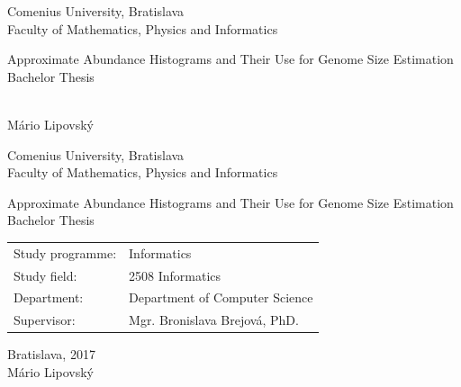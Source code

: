 \documentclass[12pt, oneside]{book}
\def\mfrok{2017}
\def\mfnazov{Approximate Abundance Histograms and Their Use for Genome Size Estimation}
\def\mftyp{Bachelor Thesis}
\def\mfautor{Mário Lipovský}
\def\mfskolitel{Mgr. Bronislava Brejová, PhD.}
\def\mfkonzultant{tit. Meno Priezvisko, tit. }
\def\mfmiesto{Bratislava, \mfrok}
\def\mfodbor{2508 Informatics}
\def\program{Informatics}
\def\mfpracovisko{Department of Computer Science}
\begin{document}

\frontmatter


\thispagestyle{empty}

\begin{center}
\sc\large
Comenius University, Bratislava\\
Faculty of Mathematics, Physics and Informatics

\vfill

{\LARGE\mfnazov}\\
\mftyp
\end{center}

\vfill

{\sc\large 
\noindent \mfrok\\
\mfautor
}

\eject %


\thispagestyle{empty}
\noindent

\begin{center}
\sc  
\large
Comenius University, Bratislava\\
Faculty of Mathematics, Physics and Informatics

\vfill

{\LARGE\mfnazov}\\
\mftyp
\end{center}

\vfill

\noindent
\begin{tabular}{ll}
Study programme: & \program \\
Study field: & \mfodbor \\
Department: & \mfpracovisko \\
Supervisor: & \mfskolitel \\
\end{tabular}

\vfill


\noindent \mfmiesto\\
\mfautor

\eject %




\end{document}
